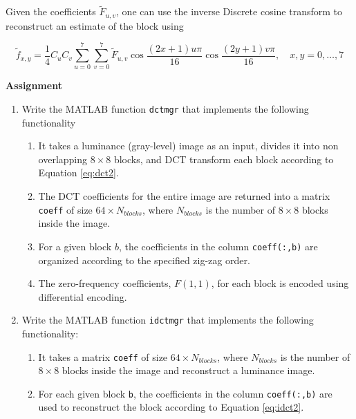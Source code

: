 \documentclass{article} %
\begin{document}
Given the coefficients $\widetilde{F}_{u,v}$, one can use the inverse Discrete cosine transform to reconstruct an estimate
of the block using

\begin{equation}
\label{eq:idct2}
\widetilde{f}_{x,y}=\frac{1}{4} C_u C_v \sum\limits_{u=0}^{7} \sum\limits_{v=0}^{7}
\widetilde{F}_{u,v} \cos \frac{(2x+1)u \pi}{16} \cos \frac{(2y+1)v \pi}{16}, \quad x,y=0,\dots,7
\end{equation}






\begin{framed}
\textbf{Assignment}
\begin{enumerate}
\item Write the MATLAB function \verb|dctmgr| that implements the following functionality

\begin{enumerate}
\item It takes a luminance (gray-level) image as an input, divides it into non overlapping
$8 \times 8$ blocks, and DCT transform each block according to Equation \ref{eq:dct2}.

\item The DCT coefficients for the entire image are returned into a matrix \verb|coeff| of size
$64 \times N_{blocks}$, where $N_{blocks}$ is the number of $8 \times 8$ blocks inside the image. 

\item For a given block $b$, the coefficients in the column \verb|coeff(:,b)| are organized according to
the specified zig-zag order.

\item The zero-frequency coefficients, $F(1,1)$, for each block is encoded using differential encoding. 
\end{enumerate}
\item Write the MATLAB function \verb|idctmgr| that implements the following functionality:

\begin{enumerate}
\item It takes a matrix \verb|coeff| of size $64 \times N_{blocks}$, where $N_{blocks}$ is the number of
$8 \times 8$ blocks inside the image and reconstruct a luminance image. 

\item For each given block \verb|b|, the coefficients in the column \verb|coeff(:,b)| are used to reconstruct
the block according to Equation \ref{eq:idct2}.
\end{enumerate}

\end{enumerate}
\end{framed}
\end{document}
